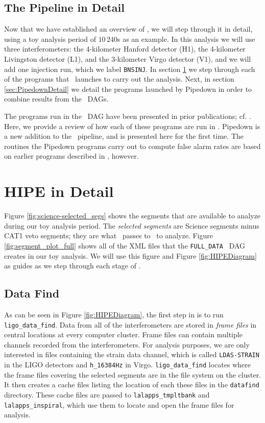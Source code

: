 \subsection{The Pipeline in Detail}

Now that we have established an overview of \ihope, we will step through it in
detail, using a toy analysis period of $10\,240$s as an example. In this
analysis we will use three interferometers: the 4-kilometer Hanford detector
(H1), the 4-kilometer Livingston detector (L1), and the 3-kilometer Virgo
detector (V1), and we will add one injection run, which we label
\texttt{BNSINJ}. In section \ref{sec:HIPEdetail} we step through each of the
programs that \hipe~launches to carry out the analysis. Next, in section
\ref{sec:PipedownDetail} we detail the programs launched by Pipedown in order to
combine results from the \hipe~\acp{DAG}.

The programs run in the \hipe~\ac{DAG} have been presented in prior
publications; cf. \cite{brown-2005-22, Allen:2005fk, Robinson:2008,
Keppel:thesis}. Here, we provide a review of how each of these programs are run
in \ihope. Pipedown is a new addition to the \ihope~pipeline, and is presented
here for the first time. The routines the Pipedown programs carry out to
compute false alarm rates are based on earlier programs described in
\cite{Keppel:thesis}, however.

\section{HIPE in Detail}
\label{sec:HIPEdetail}

Figure \ref{fig:science-selected_segs} shows the segments that are available to
analyze during our toy analysis period. The \emph{selected segments} are
Science segments minus CAT1 veto segments; they are what \ihope~passes to
\hipe~to analyze. Figure \ref{fig:segment_plot_full} shows all of the XML files
that the \verb|FULL_DATA| \hipe~\ac{DAG} creates in our toy analysis. We will
use this figure and Figure \ref{fig:HIPEDiagram} as guides as we step through
each stage of \hipe. 

\subsection{Data Find}
\label{sec:data_find}

As can be seen in Figure \ref{fig:HIPEDiagram}, the first step in \hipe is to
run \texttt{ligo\_data\_find}. Data from all of the interferometers are stored
in \emph{frame files} in central locations at every computer cluster. Frame
files can contain multiple channels recorded from the interferometers. For
analysis purposes, we are only interested in files containing the strain data
channel, which is called \texttt{LDAS-STRAIN} in the \ac{LIGO} detectors and
\texttt{h\_16384Hz} in Virgo. \texttt{ligo\_data\_find} locates where the frame
files covering the selected segments are in the file system on the cluster. It
then creates a cache files listing the location of each these files in the
\texttt{datafind} directory. These cache files are passed to
\texttt{lalapps\_tmpltbank} and \texttt{lalapps\_inspiral}, which use them to
locate and open the frame files for analysis.

